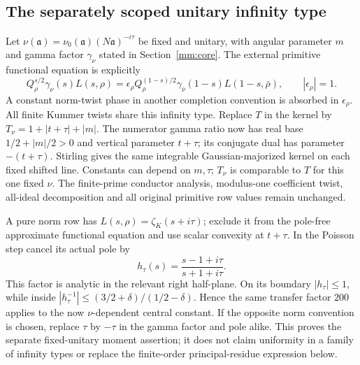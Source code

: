 \subsection{The separately scoped unitary infinity type}
Let $\nu(\mathfrak a)=\nu_0(\mathfrak a)(N\mathfrak a)^{-i\tau}$
be fixed and unitary, with angular parameter $m$ and gamma factor
$\gamma_\nu$ stated in Section~\ref{mm:core}. The external primitive
functional equation is explicitly
\[
 Q_\rho^{s/2}\gamma_\nu(s)L(s,\rho)
 =\epsilon_\rho Q_\rho^{(1-s)/2}
                 \gamma_{\bar\nu}(1-s)L(1-s,\bar\rho),
 \qquad |\epsilon_\rho|=1.
\]
A constant norm-twist phase in another completion convention is absorbed
in $\epsilon_\rho$. All finite Kummer twists share this infinity type.
Replace $T$ in the kernel by $T_\nu=1+|t+\tau|+|m|$.
The numerator gamma ratio now has real base $1/2+|m|/2>0$ and
vertical parameter $t+\tau$; its conjugate dual has parameter
$-(t+\tau)$. Stirling gives the same integrable Gaussian-majorized
kernel on each fixed shifted line. Constants can depend on $m,\tau$;
$T_\nu$ is comparable to $T$ for this one fixed $\nu$.
The finite-prime conductor analysis, modulus-one coefficient twist,
all-ideal decomposition and all original primitive row values remain
unchanged.

A pure norm row has $L(s,\rho)=\zeta_K(s+i\tau)$; exclude it from
the pole-free approximate functional equation and use scalar convexity
at $t+\tau$. In the Poisson step cancel its actual pole by
\[
 h_\tau(s)=\frac{s-1+i\tau}{s+1+i\tau}.
\]
This factor is analytic in the relevant right half-plane. On its
boundary $|h_\tau|\le1$, while inside
$|h_\tau^{-1}|\le(3/2+\delta)/(1/2-\delta)$.
Hence the same transfer factor $200$ applies to the now
$\nu$-dependent central constant. If the opposite norm convention is
chosen, replace $\tau$ by $-\tau$ in the gamma factor and pole alike.
This proves the separate fixed-unitary moment assertion; it does not
claim uniformity in a family of infinity types or replace the
finite-order principal-residue expression below.

